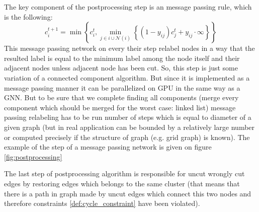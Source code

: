 \documentclass[10pt, twocolumn, a4paper]{article}
\theoremstyle{definition}
\begin{document}
\begin{figure*}[h]
    \caption{Illustration of the step of the message passing postprocessing network: colors and labels in nodes corresponds to the
        cluster of nodes: same color and label -- same cluster. Black edges is a uncut edges of the original graph $G$ and
        \textcolor{gray!80}{gray} -- cut edges of $G$. After a message passing step 3 nodes which have been connected by uncut edges
        changed their labels to the minimal label among the neighborhood. At the same time the node with label 4 didn't changed their label
        because it is not connected by uncut edge to any node with smaller label on this step. Also we denote with \textcolor{blue}{blue} color edge that became
        incident to nodes from the same cluster and therefore
        on the last step of postprocessing algorithm will be restored.} \label{fig:postprocessing}
\end{figure*}

The key component of the postprocessing step is an message passing rule, which is the following:
\begin{equation} \label{def:postprocessing_mpn}
    c_i^{t+1} = \min \left\{ c_i^{t}, \min\limits_{j \in i \cup \mathcal{N}(i)} \left\{ (1 - y_{ij})c_j^{t} + y_{ij} \cdot \infty \right\}  \right\}
\end{equation}
This message passing network on every their step relabel nodes in a way that the resulted label is
equal to the minimum label among the node itself and their adjacent nodes unless adjacent node has been cut.
So, this step is just some variation of a connected component algorithm. But since it is implemented as a message passing
manner it can be parallelized on GPU in the same way as a GNN. But to be sure that we complete finding
all components (merge every component which should be merged for the worst case: linked list) message passing
relabeling has to be run number of steps which is equal to diameter of a given graph (but in real application can
be bounded by a relatively large number or computed precisely if the structure of graph (e.g. grid graph)
is known). The example of the step of a message passing network is given on figure \ref{fig:postprocessing}

The last step of postprocessing algorithm is responsible for uncut wrongly cut edges by restoring edges
which belongs to the same cluster (that means that there is a path in graph made by uncut edges which
connect this two nodes and therefore constraints \eqref{def:cycle_constraint} have been violated).
\end{document}
